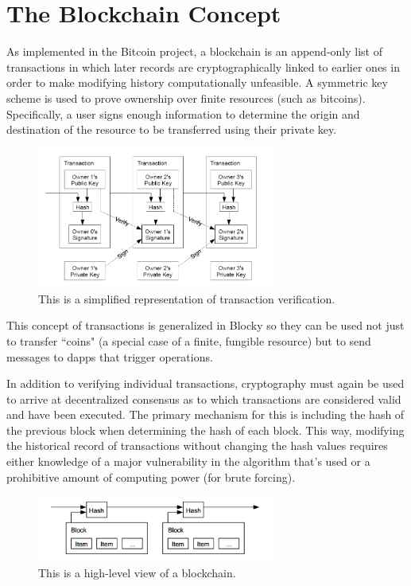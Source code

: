 \documentclass[letterpaper]{article}
\begin{document}
\section{The Blockchain Concept}
As implemented in the Bitcoin project, a blockchain is an append-only list of transactions in which later records are cryptographically linked to earlier ones in order to make modifying history computationally unfeasible. A symmetric key scheme is used to prove ownership over finite resources (such as bitcoins). Specifically, a user signs enough information to determine the origin and destination of the resource to be transferred using their private key.

\begin{figure}[h]
\centering
\includegraphics[width=0.7\textwidth]{transaction_chain.png}
\caption{\label{fig:transaction_chain}This is a simplified representation of transaction verification\cite{nakamoto09}.}
\end{figure}

This concept of transactions is generalized in Blocky so they can be used not just to transfer ``coins" (a special case of a finite, fungible resource) but to send messages to dapps that trigger operations.

In addition to verifying individual transactions, cryptography must again be used to arrive at decentralized consensus as to which transactions are considered valid and have been executed. The primary mechanism for this is including the hash of the previous block when determining the hash of each block. This way, modifying the historical record of transactions without changing the hash values requires either knowledge of a major vulnerability in the algorithm that's used or a prohibitive amount of computing power (for brute forcing).

\begin{figure}[h]
\centering
\includegraphics[width=0.7\textwidth]{blockchain.png}
\caption{\label{fig:blockchain}This is a high-level view of a blockchain\cite{nakamoto09}.}
\end{figure}
\end{document}
